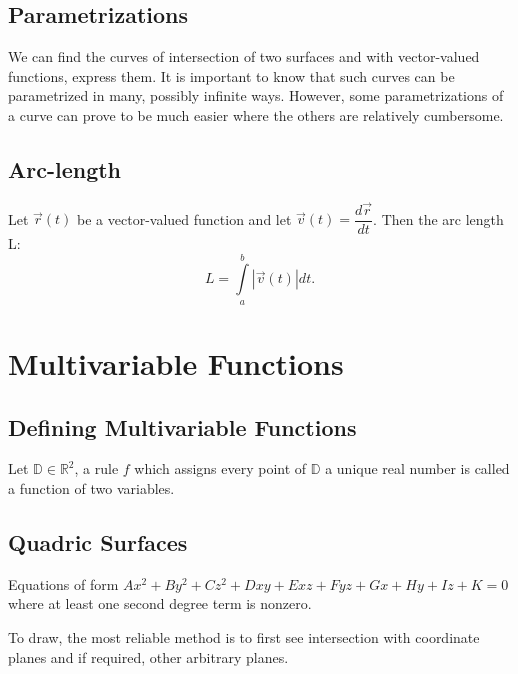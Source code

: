 \documentclass[12pt]{article}
\begin{document}
\subsection{Parametrizations}
We can find the curves of intersection of two surfaces and with vector-valued functions, express them. It is important to know that such curves can be parametrized in many, possibly infinite ways. However, some parametrizations of a curve can prove to be much easier where the others are relatively cumbersome. 
\subsection{Arc-length}
Let $\vec r(t)$ be a vector-valued function and let $\vec v(t)=\dfrac{d\vec r}{dt}$. Then the arc length L:
$$L= \int \limits_a^b |\vec v(t) | dt.$$
\newpage
\section{Multivariable Functions}
\subsection{Defining Multivariable Functions}
Let $\mathbb{D}\in\mathbb{R}^2$, a rule $f$ which assigns every point of $\mathbb{D}$ a unique real number is called a function of two variables.
\subsection{Quadric Surfaces}
Equations of form $Ax^2+By^2+Cz^2+Dxy+Exz+Fyz+Gx+Hy+Iz+K=0$ where at least one second degree term is nonzero. 

To draw, the most reliable method is to first see intersection with coordinate planes and if required, other arbitrary planes. 
\end{document}

